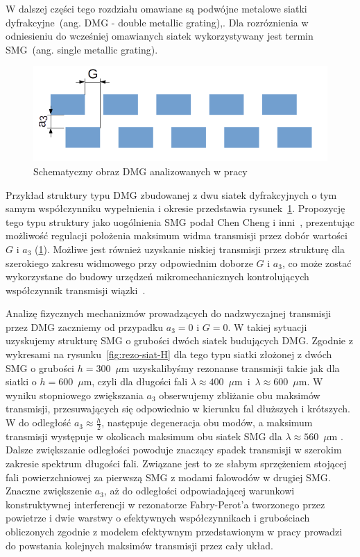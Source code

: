 W dalszej części tego rozdziału omawiane są podwójne metalowe siatki dyfrakcyjne~(ang. DMG - double metallic grating),. Dla rozróznienia w odniesieniu do wcześniej omawianych siatek wykorzystywany jest termin SMG~(ang. single metallic grating).

\begin{figure}[tb]
	\includegraphics[width=\textwidth]{images/dmg/dmg_general_schem.png}
	\caption{Schematyczny obraz DMG analizowanych w pracy \cite{cheng2007controllable}}
	\label{fig:cheng_dmg_schem}
\end{figure}

Przykład struktury typu DMG zbudowanej z dwu siatek dyfrakcyjnych o tym samym współczynniku wypełnienia i okresie przedstawia rysunek~\ref{fig:cheng_dmg_schem}. Propozycję tego typu struktury jako uogólnienia SMG podał Chen Cheng i inni~\cite{cheng2007controllable}, prezentując możliwość regulacji położenia maksimum widma transmisji przez dobór wartości $G$ i $a_3$ (\ref{fig:cheng_dmg_schem}). Możliwe jest również uzyskanie niskiej transmisji przez strukturę dla szerokiego zakresu widmowego przy odpowiednim doborze $G$ i $a_3$, co może zostać wykorzystane do budowy urzędzeń mikromechanicznych kontrolujących współczynnik transmisji wiązki~\cite{cheng2007controllable}.

Analizę fizycznych mechanizmów prowadzących do nadzwyczajnej transmisji przez DMG zaczniemy od przypadku $a_3=0$ i $G=0$. W takiej sytuacji uzyskujemy strukturę SMG o grubości dwóch siatek budujących DMG. Zgodnie z wykresami na rysunku~\ref{fig:rezo-siat-H} dla tego typu siatki złożonej z dwóch SMG o grubości $h=300$~$\mu$m uzyskalibyśmy rezonanse transmisji takie jak dla siatki o $h=600$~$\mu$m, czyli dla długości fali $\lambda \approx 400$~$\mu$m~i~$\lambda \approx 600$~$\mu$m. W wyniku stopniowego zwiększania $a_3$ obserwujemy zbliżanie obu maksimów transmisji, przesuwających się odpowiednio w kierunku fal dłuższych i krótszych. W do odległość $a_3 \approx \frac{h}{2}$, następuje degeneracja obu modów, a maksimum transmisji występuje w okolicach maksimum obu siatek SMG dla $\lambda \approx 560$~$\mu$m \cite{cheng2008physical}. Dalsze zwiększanie odległości powoduje znaczący spadek transmisji w szerokim zakresie spektrum długości fali. Związane jest to ze słabym sprzężeniem stojącej fali powierzchniowej za pierwszą SMG z modami falowodów w drugiej SMG. Znaczne zwiększenie $a_3$, aż do odległości odpowiadającej warunkowi konstruktywnej interferencji w rezonatorze Fabry-Perot'a tworzonego przez powietrze i dwie warstwy o efektywnych współczynnikach i grubościach obliczonych zgodnie z modelem efektywnym przedstawionym w pracy \cite{shen2005mechanism} prowadzi do powstania kolejnych maksimów transmisji przez cały układ.

